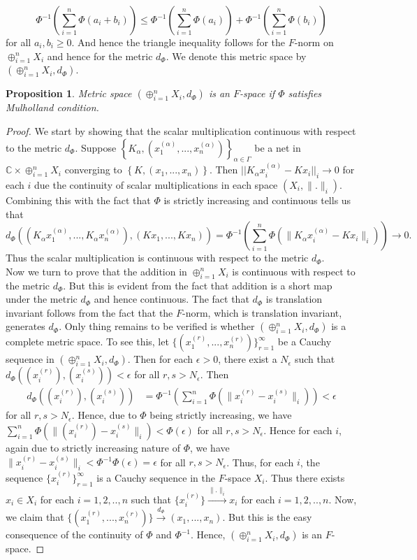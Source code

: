 \documentclass[pdflatex,sn-mathphys-num]{sn-jnl}%
\theoremstyle{thmstyleone}%
\newtheorem{proposition}[theorem]{Proposition}%
\theoremstyle{thmstyletwo}%
\theoremstyle{thmstylethree}%
\begin{document}
	$$\Phi^{-1}\left(\sum_{i=1}^n \Phi(a_i+b_i)\right)\leq \Phi^{-1}\left(\sum_{i=1}^n \Phi(a_i)\right)+\Phi^{-1}\left(\sum_{i=1}^n \Phi(b_i)\right)$$ for all $a_i,b_i\geq 0$.
	And hence the triangle inequality follows for the $F$-norm on $\oplus_{i=1}^nX_i$ and hence for the metric $d_\Phi$. We denote this metric space by $\left(\oplus_{i=1}^n  X_i, d_\Phi\right)$.
	\begin{proposition}
		Metric space $\left(\oplus_{i=1}^nX_i, d_\Phi\right)$ is an $F$-space if $\Phi$ satisfies Mulholland condition.
	\end{proposition}
	\begin{proof}
		We start by showing that the scalar multiplication continuous with respect to the metric $d_\Phi$. Suppose $\left\{K_\alpha,(x^{(\alpha)}_1,...,x^{(\alpha)}_n)\right\}_{\alpha\in \Gamma}$ be a net in $\mathbb C\times \oplus_{i=1}^nX_i$ converging to $\left\{K,(x_1,...,x_n)\right\}$. Then $||K_\alpha x_i^{(\alpha)}-Kx_i||_i\to 0$ for each $i$ due the continuity of scalar multiplications in each space $(X_i,\|.\|_i)$.
	Combining this with the fact that $\Phi$ is strictly increasing and continuous tells us that $$d_\Phi\left((K_\alpha x_1^{(\alpha)},...,K_\alpha x^{(\alpha)}_n),(Kx_1,...,Kx_n)\right)=\Phi^{-1}\left(\sum_{i=1}^n\Phi(\|K_\alpha x^{(\alpha)}_i-Kx_i\|_i)\right)\to 0.$$
		Thus the scalar multiplication is continuous with respect to the metric $d_\Phi$.\\
		Now we turn to prove that the addition in $\oplus_{i=1}^nX_i$ is continuous with respect to the metric $d_\Phi$. But this is evident from the fact that addition is a short map under the metric $d_\Phi$ and hence continuous. The fact that $d_\Phi$ is translation invariant follows from the fact that the $F$-norm, which is translation invariant, generates $d_\Phi$. Only thing remains to be verified is whether $\left(\oplus_{i=1}^n X_i,d_\Phi\right)$  is a complete metric space. To see this, let $\{(x_1^{(r)},...,x_n^{(r)})\}_{r=1}^\infty$ be a Cauchy sequence in $\left(\oplus_{i=1}^nX_i, d_\Phi\right)$. Then for each $\epsilon>0$, there exist a $N_\epsilon$ such that $d_\Phi((x_i^{(r)}),(x_i^{(s)}))<\epsilon$ for all $r,s>N_\epsilon$. Then
		\begin{align}
			d_\Phi\left((x_i^{(r)}),(x_i^{(s)})\right)&=\Phi^{-1}\left(\sum_{i=1}^n\Phi (\|x_i^{(r)}-x_i^{(s)}\|_i)\right)<\epsilon\nonumber
			\end{align}
			for all $r,s>N_{\epsilon}$. Hence, due to $\Phi$ being strictly increasing, we have $\sum_{i=1}^n\Phi(\|(x_i^{(r)})-x_i^{(s)}\|_i)<\Phi(\epsilon)$ for all $r,s>N_{\epsilon}$. Hence for each $i$, again due to strictly increasing nature of $\Phi$, we have $\|x_i^{(r)}-x_i^{(s)}\|_i<\Phi^{-1}\Phi(\epsilon)=\epsilon$ for all $r,s>N_\epsilon$. Thus, for each $i$, the sequence $\{x_i^{(r)}\}_{r=1}^\infty$ is a Cauchy sequence in the $F$-space $X_i$. Thus there exists $x_i\in X_i$ for each $i=1,2,..,n$ such that $\{x_i^{(r)}\}\overset{\|.\|_i}{\to} x_i$ for each $i=1,2,..,n$. Now, we claim that $\{(x_1^{(r)},...,x_n^{(r)})\}\overset{d_\Phi}{\to}(x_1,...,x_n)$. But this is the easy consequence of the continuity of $\Phi$ and $\Phi^{-1}$. Hence, $\left(\oplus_{i=1}^nX_i,d_\Phi\right)$ is an $F$-space.
	\end{proof}
	
\end{document}
